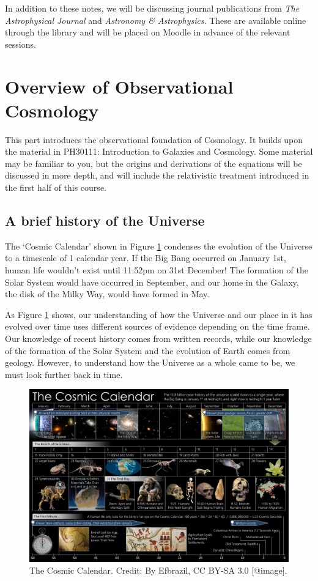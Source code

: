 \documentclass[11pt,a4paper,notoc]{tufte-handout}
\begin{document}
In addition to these notes, we will be discussing journal publications
from \emph{The Astrophysical Journal} and \emph{Astronomy \& Astrophysics}. These
are available online through the library and will be placed on Moodle
in advance of the relevant sessions.

\hypertarget{ch:intro_obs}{%
\section{Overview of Observational Cosmology}\label{ch:intro_obs}}

This part introduces the observational foundation of Cosmology. It
builds upon the material in PH30111: Introduction to Galaxies and
Cosmology. Some material may be familiar to you, but the origins and
derivations of the equations will be discussed in more depth, and will
include the relativistic treatment introduced in the first half of this
course.

\hypertarget{sec:history}{%
\subsection{A brief history of the Universe}\label{sec:history}}

The `Cosmic Calendar' shown in
Figure \ref{fig:cosmic-calendar} condenses the evolution of the Universe
to a timescale of 1 calendar year. If the Big Bang occurred on January
1st, human life wouldn't exist until 11:52pm on 31st December! The
formation of the Solar System would have occurred in September, and our
home in the Galaxy, the disk of the Milky Way, would have formed in May.

As
Figure \ref{fig:cosmic-calendar} shows, our understanding of how the
Universe and our place in it has evolved over time uses different
sources of evidence depending on the time frame. Our knowledge of recent
history comes from written records, while our knowledge of the formation
of the Solar System and the evolution of Earth comes from geology.
However, to understand how the Universe as a whole came to be, we must
look further back in time.

\begin{figure}
\includegraphics[width=1\linewidth]{Images/CosmicCalendar} \caption{The Cosmic Calendar. Credit: By Efbrazil, CC BY-SA 3.0 [@image].}\label{fig:cosmic-calendar}
\end{figure}
\end{document}
